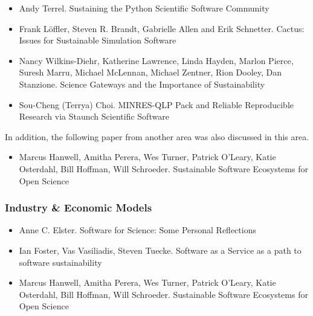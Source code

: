 \documentclass[11pt, oneside]{amsart}
\begin{document}
\begin{itemize}
\item Andy Terrel. Sustaining the Python Scientific Software Community~\cite{Terrel_WSSSPE}

\item Frank L\"{o}ffler, Steven R. Brandt, Gabrielle Allen and Erik
  Schnetter. Cactus: Issues for Sustainable Simulation Software~\cite{Loffler_WSSSPE}

\item Nancy Wilkins-Diehr, Katherine Lawrence, Linda Hayden, Marlon Pierce, Suresh Marru, Michael McLennan, Michael Zentner, Rion Dooley, Dan Stanzione. Science Gateways and the Importance of Sustainability~\cite{Wilkins-Diehr_WSSSPE}


\item Sou-Cheng (Terrya) Choi. MINRES-QLP Pack and Reliable
  Reproducible Research via Staunch Scientific Software~\cite{Choi_WSSSPE}


\end{itemize}

In addition, the following paper from another area was also discussed
in this area.

\begin{itemize}

\item Marcus Hanwell, Amitha Perera, Wes Turner, Patrick O'Leary,
  Katie Osterdahl, Bill Hoffman, Will Schroeder. Sustainable Software
  Ecosystems for Open Science~\cite{Hanwell_WSSSPE}

\end{itemize}

\subsubsection*{Industry \& Economic Models}

\begin{itemize}

\item Anne C. Elster. Software for Science: Some Personal Reflections~\cite{Elster_WSSSPE}

\item Ian Foster, Vas Vasiliadis, Steven Tuecke. Software as a Service
  as a path to software sustainability~\cite{Foster_WSSSPE}

\item Marcus Hanwell, Amitha Perera, Wes Turner, Patrick O'Leary,
  Katie Osterdahl, Bill Hoffman, Will Schroeder. Sustainable Software
  Ecosystems for Open Science~\cite{Hanwell_WSSSPE}

\end{itemize}
\end{document}
